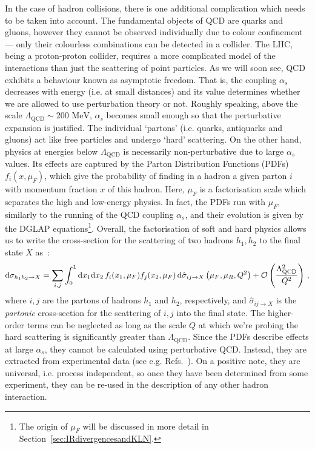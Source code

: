 \documentclass[main.tex]{subfiles}
\begin{document}
In the case of hadron collisions, there is one additional complication which needs to be taken into account. The fundamental objects of QCD are quarks and gluons, however they cannot be observed individually due to colour confinement --- only their colourless combinations can be detected in a collider. The LHC, being a proton-proton collider, requires a more complicated model of the interactions than just the scattering of point particles. As we will soon see, QCD exhibits a behaviour known as asymptotic freedom. That is, the coupling $\alpha_s$ decreases with energy (i.e. at small distances) and its value determines whether we are allowed to use perturbation theory or not. Roughly speaking, above the scale $\Lambda_\text{QCD} \sim 200 \text{ MeV}$, $\alpha_s$ becomes small enough so that the perturbative expansion is justified. The individual `partons' (i.e. quarks, antiquarks and gluons) act like free particles and undergo `hard' scattering\cite{PhysRevLett.23.1415}. On the other hand, physics at energies below $\Lambda_\text{QCD}$ is necessarily non-perturbative due to large $\alpha_s$ values. Its effects are captured by the Parton Distribution Functions (PDFs) $f_i(x, \mu_F)$, which give the probability of finding in a hadron a given parton $i$ with momentum fraction $x$ of this hadron. Here, $\mu_F$ is a factorisation scale which separates the high and low-energy physics. In fact, the PDFs run with $\mu_F$, similarly to the running of the QCD coupling $\alpha_s$, and their evolution is given by the DGLAP equations\footnote{The origin of $\mu_F$ will be discussed in more detail in Section~\ref{sec:IRdivergencesandKLN}.}. Overall, the factorisation of soft and hard physics allows us to write the cross-section for the scattering of two hadrons $h_1, h_2$ to the final state $X$ as~\cite{Collins:1989gx}:
\begin{equation} \label{eq:factorisation}
    \mathrm{d} \sigma_{h_1 h_2 \to X} = \sum_{i,j} \int_0^1 \mathrm{d} x_1 \mathrm{d} x_2 \, f_i(x_1, \mu_F) f_j(x_2, \mu_F) \, \mathrm{d} \hat{\sigma}_{ij \to X}\left(\mu_F, \mu_R, Q^2\right) + \mathcal{O}\left(\frac{\Lambda_\text{QCD}^2}{Q^2}\right)\,,
\end{equation}
where $i, j$ are the partons of hadrons $h_1$ and $h_2$, respectively, and $\hat{\sigma}_{ij \to X}$ is the \textit{partonic} cross-section for the scattering of $i,j$ into the final state. The higher-order terms can be neglected as long as the scale $Q$ at which we're probing the hard scattering is significantly greater than $\Lambda_{\text{QCD}}$. Since the PDFs describe effects at large $\alpha_s$, they cannot be calculated using perturbative QCD. Instead, they are extracted from experimental data (see e.g. Refs.~\cite{H1:2015ubc, Alekhin:2017kpj, Hou:2019efy, NNPDF:2021uiq, Buckley:2014ana}). On a positive note, they are universal, i.e. process independent, so once they have been determined from some experiment, they can be re-used in the description of any other hadron interaction.
\end{document}
